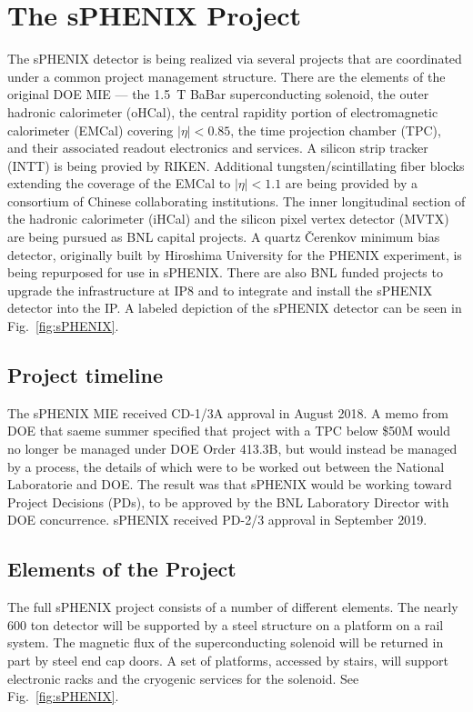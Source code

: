 \chapter{The sPHENIX Project}
\label{chap:project}

The sPHENIX detector is being realized via several projects that are
coordinated under a common project management structure.  There are
the elements of the original DOE MIE --- the 1.5~T BaBar
superconducting solenoid, the outer hadronic calorimeter (oHCal), the
central rapidity portion of electromagnetic calorimeter (EMCal)
covering $|\eta| < 0.85$, the time projection chamber (TPC), and their
associated readout electronics and services.  A silicon strip tracker
(INTT) is being provied by RIKEN.  Additional tungsten/scintillating
fiber blocks extending the coverage of the EMCal to $|\eta| < 1.1$ are
being provided by a consortium of Chinese collaborating institutions.
The inner longitudinal section of the hadronic calorimeter (iHCal) and
the silicon pixel vertex detector (MVTX) are being pursued as BNL
capital projects.  A quartz \v{C}erenkov minimum bias detector,
originally built by Hiroshima University for the PHENIX experiment, is
being repurposed for use in sPHENIX.  There are also BNL funded
projects to upgrade the infrastructure at IP8 and to integrate and
install the sPHENIX detector into the IP.  A labeled depiction of the
sPHENIX detector can be seen in Fig.~\ref{fig:sPHENIX}.

\section{Project timeline}
\label{sec:timeline}

The sPHENIX MIE received CD-1/3A approval in August 2018.  A memo from
DOE that saeme summer specified that project with a TPC below \$50M
would no longer be managed under DOE Order 413.3B, but would instead
be managed by a process, the details of which were to be worked out
between the National Laboratorie and DOE.  The result was that sPHENIX
would be working toward Project Decisions (PDs), to be approved by the
BNL Laboratory Director with DOE concurrence.  sPHENIX received PD-2/3
approval in September 2019.

\section{Elements of the Project}
\label{sec:elements}

The full sPHENIX project consists of a number of different elements.
The nearly 600 ton detector will be supported by a steel structure on
a platform on a rail system.  The magnetic flux of the superconducting
solenoid will be returned in part by steel end cap doors.  A set of
platforms, accessed by stairs, will support electronic racks and the
cryogenic services for the solenoid.  See Fig.~\ref{fig:sPHENIX}.

